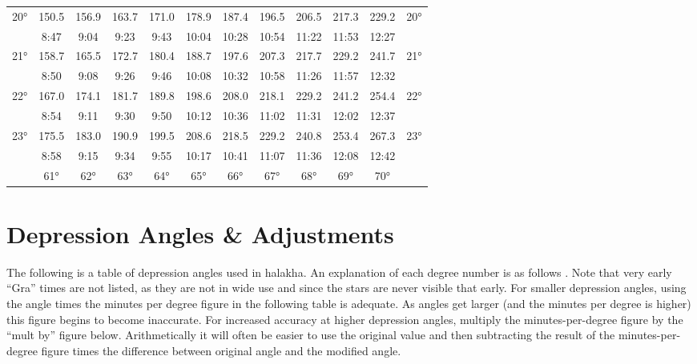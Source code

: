 \begin{footnotesize}
\begin{tabular}{c || c | c | c | c | c | c | c | c | c | c || c}
		\multirow{2}{*}{20°}&150.5&156.9&163.7&171.0&178.9&187.4&196.5&206.5&217.3&229.2&\multirow{2}{*}{20°}\\ \space&8:47&9:04&9:23&9:43&10:04&10:28&10:54&11:22&11:53&12:27&\space\\\hline
		\multirow{2}{*}{21°}&158.7&165.5&172.7&180.4&188.7&197.6&207.3&217.7&229.2&241.7&\multirow{2}{*}{21°}\\ \space&8:50&9:08&9:26&9:46&10:08&10:32&10:58&11:26&11:57&12:32&\space\\\hline
		\multirow{2}{*}{22°}&167.0&174.1&181.7&189.8&198.6&208.0&218.1&229.2&241.2&254.4&\multirow{2}{*}{22°}\\ \space&8:54&9:11&9:30&9:50&10:12&10:36&11:02&11:31&12:02&12:37&\space\\\hline
		\multirow{2}{*}{23°}&175.5&183.0&190.9&199.5&208.6&218.5&229.2&240.8&253.4&267.3&\multirow{2}{*}{23°}\\ \space&8:58&9:15&9:34&9:55&10:17&10:41&11:07&11:36&12:08&12:42&\space\\\hline
		\hline\space &61°&62°&63°&64°&65°&66°&67°&68°&69°&70°
\end{tabular}\end{footnotesize}

\section{Depression Angles \& Adjustments}

The following is a table of depression angles used in halakha.  An explanation of each degree number is as follows \parencite{dvaryom}. Note that very early “Gra” times are not listed, as they are not in wide use and since the stars are never visible that early. For smaller depression angles, using the angle times the minutes per degree figure in the following table is adequate. As angles get larger (and the minutes per degree is higher) this figure begins to become inaccurate. For increased accuracy at higher depression angles, multiply the minutes-per-degree figure by the “mult by” figure below. Arithmetically it will often be easier to use the original value and then subtracting the result of the minutes-per-degree figure times the difference between original angle and the modified angle.

